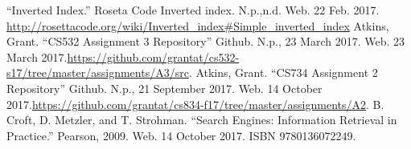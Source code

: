 \documentclass[letterpaper,11pt]{article}
\begin{document}
\clearpage



\begin{thebibliography}{9}
``Inverted Index.'' Roseta Code Inverted index. N.p.,n.d. Web. 22 Feb. 2017. \url{http://rosettacode.org/wiki/Inverted_index#Simple_inverted_index}
Atkins, Grant. ``CS532 Assignment 3 Repository'' Github. N.p., 23 March 2017. Web. 23 March 2017.\url{https://github.com/grantat/cs532-s17/tree/master/assignments/A3/src}.
Atkins, Grant. ``CS734 Assignment 2 Repository'' Github. N.p., 21 September 2017. Web. 14 October 2017.\url{https://github.com/grantat/cs834-f17/tree/master/assignments/A2}.
B. Croft, D. Metzler, and T. Strohman. ``Search Engines: Information Retrieval in Practice.'' Pearson, 2009. Web. 14 October 2017. ISBN 9780136072249.
\end{thebibliography}
\end{document}
